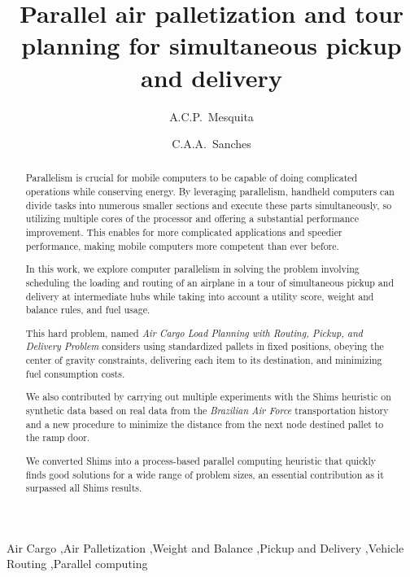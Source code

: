 \documentclass[preprint,authoryear]{elsarticle}
\begin{document}
\begin{frontmatter}

\title{Parallel air palletization and tour planning for simultaneous pickup and delivery}

\author{A.C.P.~Mesquita}

\author{C.A.A.~Sanches}

\address {Instituto Tecnol\'{o}gico de Aeron\'{a}utica - DCTA/ITA/IEC\\
Pra\c{c}a Mal. Eduardo Gomes, 50\\
S\~{a}o Jos\'{e} dos Campos - SP - 12.228-900 - Brazil}


\begin{abstract}

Parallelism is crucial for mobile computers to be capable of doing complicated operations while conserving energy. By leveraging parallelism, handheld computers can divide tasks into numerous smaller sections and execute these parts simultaneously, so utilizing multiple cores of the processor and offering a substantial performance improvement. This enables for more complicated applications and speedier performance, making mobile computers more competent than ever before.

In this work, we explore computer parallelism in solving the problem involving scheduling the loading and routing of an airplane in a tour of simultaneous pickup and delivery at intermediate hubs while taking into account a utility score, weight and balance rules, and fuel usage.

This hard problem, named {\it Air Cargo Load Planning with Routing, Pickup, and Delivery Problem} considers using standardized pallets in fixed positions, obeying the center of gravity constraints, delivering each item to its destination, and minimizing fuel consumption costs.

We also contributed by carrying out multiple experiments with the Shims heuristic on synthetic data based on real data from the {\it Brazilian Air Force} transportation history and a new procedure to minimize the distance from the next node destined pallet to the ramp door.

We converted Shims into a process-based parallel computing heuristic that quickly finds good solutions for a wide range of problem sizes, an essential contribution as it surpassed all Shims results.

\end{abstract}

\begin{keyword}
Air Cargo \sep Air Palletization \sep Weight and Balance \sep Pickup and Delivery \sep Vehicle Routing \sep Parallel computing
\end{keyword}

\end{frontmatter}
\end{document}
